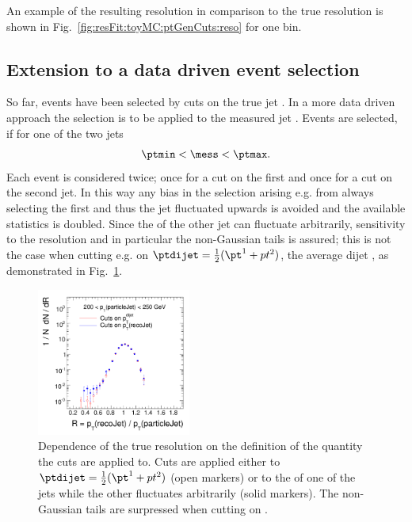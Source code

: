 \documentclass[a4paper]{cmspaper} %
\begin{document}
An example of the resulting resolution in comparison to the true
resolution is shown in Fig.~\ref{fig:resFit:toyMC:ptGenCuts:reso} for
one \truth bin.


\subsection{Extension to a data driven event selection}\label{sec:resFit:dataDrivenExt}
So far, events have been selected by cuts on the true jet \pt.
In a more data driven approach the selection is to be applied to the measured jet \pt.
Events are selected, if for one of the two jets
\begin{equation*}
  \ptmin < \mess < \ptmax.
\end{equation*}
Each event is considered twice; once for a \pt cut on the first and once for a \pt cut on the second jet.
In this way any bias in the selection arising e.g. from always selecting the first and thus the jet fluctuated upwards is avoided and the available statistics is doubled.
Since the \pt of the other jet can fluctuate arbitrarily, sensitivity to the resolution and in particular the non-Gaussian tails is assured; this is not the case when cutting e.g. on \mbox{$\ptdijet = \frac{1}{2}(\pt^{1}+pt^{2})$}, the average dijet \pt, as demonstrated in Fig.~\ref{fig:resFit:ptBinning}.

\begin{figure}[ht]
  \centering
  \includegraphics[width=0.45\textwidth]{figures/resFit_QCD_PtBinningComp}
  \caption{Dependence of the true resolution on the definition of the quantity the cuts are applied to.
    Cuts are applied either to \mbox{$\ptdijet = \frac{1}{2}(\pt^{1}+pt^{2})$} (open markers) or to the \pt of one of the jets while the other fluctuates arbitrarily (solid markers).
    The non-Gaussian tails are surpressed when cutting on \ptdijet.}
  \label{fig:resFit:ptBinning}
\end{figure}
\end{document}
